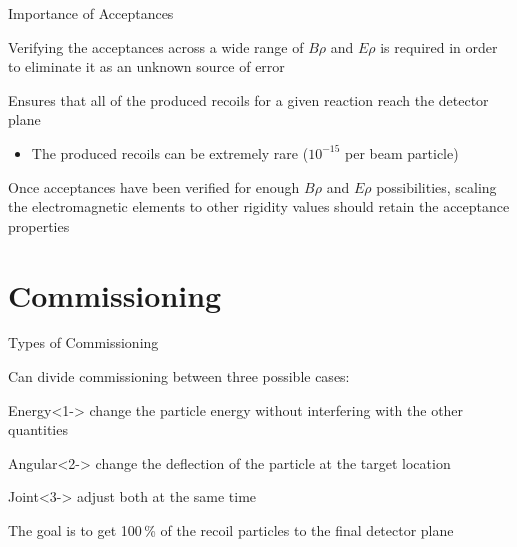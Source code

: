 \documentclass[10pt]{beamer}
\begin{document}
\begin{frame}[fragile]{Importance of Acceptances}

    Verifying the acceptances across a wide range of $B\rho$ and $E\rho$
    is required in order to eliminate it as an unknown source of error

    Ensures that all of the produced recoils for a given reaction reach
    the detector plane
    \begin{itemize}
        \item The produced recoils can be extremely rare ($10^{-15}$ per
            beam particle)
    \end{itemize}

    Once acceptances have been verified for enough $B\rho$ and $E\rho$
    possibilities, scaling the electromagnetic elements to other
    rigidity values should retain the acceptance properties

\end{frame}

\section{Commissioning}

\begin{frame}[fragile]{Types of Commissioning}

    Can divide commissioning between three possible cases:

    \begin{alertblock}{Energy}<1->%
        change the particle energy without interfering with the other
        quantities
    \end{alertblock}
    \begin{alertblock}{Angular}<2->
        change the deflection of the particle at the target location
    \end{alertblock}
    \begin{alertblock}{Joint}<3->
        adjust both at the same time
    \end{alertblock}

    The goal is to get 100\,\% of the recoil particles to the final
    detector plane

\end{frame}


\end{document}
